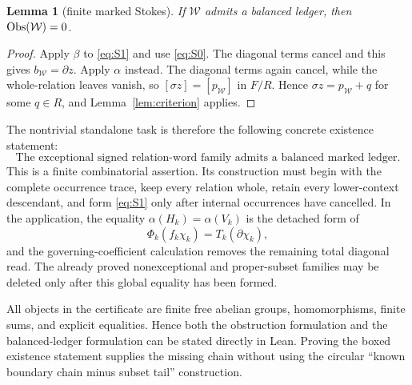 \documentclass[11pt]{article}
\newtheorem{lemma}{Lemma}
\newcommand{\Obs}{\mathop{\rm Obs}}
\begin{document}
\begin{lemma}[finite marked Stokes]\label{lem:stokes}
If $\mathcal W$ admits a balanced ledger, then
$\Obs(\mathcal W)=0$.
\end{lemma}

\begin{proof}
Apply $\beta$ to \eqref{eq:S1} and use \eqref{eq:S0}.  The diagonal terms
cancel and this gives $b_{\mathcal W}=\partial z$.  Apply $\alpha$ instead.
The diagonal terms again cancel, while the whole-relation leaves vanish, so
$[\sigma z]=[p_{\mathcal W}]$ in $F/R$.  Hence
$\sigma z=p_{\mathcal W}+q$ for some $q\in R$, and
Lemma~\ref{lem:criterion} applies.
\end{proof}

The nontrivial standalone task is therefore the following concrete existence
statement:
\[
 \boxed{\text{The exceptional signed relation-word family admits a balanced
 marked ledger.}}
\]
This is a finite combinatorial assertion.  Its construction must begin with
the complete occurrence trace, keep every relation whole, retain every
lower-context descendant, and form \eqref{eq:S1} only after internal
occurrences have cancelled.  In the application, the equality
$\alpha(H_k)=\alpha(V_k)$ is the detached form of
\[
       \Phi_k(f_k\chi_k)=T_k(\partial\chi_k),
\]
and the governing-coefficient calculation removes the remaining total
diagonal read.  The already proved nonexceptional and proper-subset families
may be deleted only after this global equality has been formed.

All objects in the certificate are finite free abelian groups, homomorphisms,
finite sums, and explicit equalities.  Hence both the obstruction formulation
and the balanced-ledger formulation can be stated directly in Lean.  Proving
the boxed existence statement supplies the missing chain without using the
circular ``known boundary chain minus subset tail'' construction.
\end{document}
